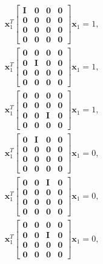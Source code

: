 \documentclass{article}
\begin{document}
\begin{align}
    \mathbf{x}_1^T  \begin{bmatrix} \mathbf{I} & \mathbf{0} & \mathbf{0} & \mathbf{0} \\ \mathbf{0} & \mathbf{0} & \mathbf{0} & \mathbf{0} \\ \mathbf{0} & \mathbf{0} & \mathbf{0} & \mathbf{0} \\ \mathbf{0} & \mathbf{0} & \mathbf{0} & \mathbf{0} \end{bmatrix} \mathbf{x}_1 = 1,\\
    \mathbf{x}_1^T  \begin{bmatrix} \mathbf{0} & \mathbf{0} & \mathbf{0} & \mathbf{0} \\ \mathbf{0} & \mathbf{I} & \mathbf{0} & \mathbf{0} \\ \mathbf{0} & \mathbf{0} & \mathbf{0} & \mathbf{0} \\ \mathbf{0} & \mathbf{0} & \mathbf{0} & \mathbf{0} \end{bmatrix} \mathbf{x}_1 = 1,\\
    \mathbf{x}_1^T  \begin{bmatrix} \mathbf{0} & \mathbf{0} & \mathbf{0} & \mathbf{0} \\ \mathbf{0} & \mathbf{0} & \mathbf{0} & \mathbf{0} \\ \mathbf{0} & \mathbf{0} & \mathbf{I} & \mathbf{0} \\ \mathbf{0} & \mathbf{0} & \mathbf{0} & \mathbf{0} \end{bmatrix} \mathbf{x}_1 = 1,\\
    \mathbf{x}_1^T  \begin{bmatrix} \mathbf{0} & \mathbf{I} & \mathbf{0} & \mathbf{0} \\ \mathbf{0} & \mathbf{0} & \mathbf{0} & \mathbf{0} \\ \mathbf{0} & \mathbf{0} & \mathbf{0} & \mathbf{0} \\ \mathbf{0} & \mathbf{0} & \mathbf{0} & \mathbf{0} \end{bmatrix} \mathbf{x}_1 = 0,\\
    \mathbf{x}_1^T  \begin{bmatrix} \mathbf{0} & \mathbf{0} & \mathbf{I} & \mathbf{0} \\ \mathbf{0} & \mathbf{0} & \mathbf{0} & \mathbf{0} \\ \mathbf{0} & \mathbf{0} & \mathbf{0} & \mathbf{0} \\ \mathbf{0} & \mathbf{0} & \mathbf{0} & \mathbf{0} \end{bmatrix} \mathbf{x}_1 = 0,\\
    \mathbf{x}_1^T  \begin{bmatrix} \mathbf{0} & \mathbf{0} & \mathbf{0} & \mathbf{0} \\ \mathbf{0} & \mathbf{0} & \mathbf{I} & \mathbf{0} \\ \mathbf{0} & \mathbf{0} & \mathbf{0} & \mathbf{0} \\ \mathbf{0} & \mathbf{0} & \mathbf{0} & \mathbf{0} \end{bmatrix} \mathbf{x}_1 = 0,\\
\end{align}
\end{document}
